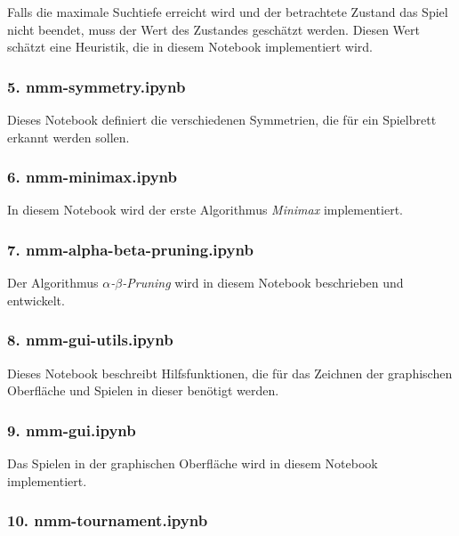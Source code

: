 \documentclass[11pt]{article}
\begin{document}
Falls die maximale Suchtiefe erreicht wird und der betrachtete Zustand
das Spiel nicht beendet, muss der Wert des Zustandes geschätzt werden.
Diesen Wert schätzt eine Heuristik, die in diesem Notebook implementiert
wird.

\hypertarget{nmm-symmetry.ipynb}{%
\subsubsection{5. nmm-symmetry.ipynb}\label{nmm-symmetry.ipynb}}

Dieses Notebook definiert die verschiedenen Symmetrien, die für ein
Spielbrett erkannt werden sollen.

\hypertarget{nmm-minimax.ipynb}{%
\subsubsection{6. nmm-minimax.ipynb}\label{nmm-minimax.ipynb}}

In diesem Notebook wird der erste Algorithmus \emph{Minimax}
implementiert.

\hypertarget{nmm-alpha-beta-pruning.ipynb}{%
\subsubsection{7.
nmm-alpha-beta-pruning.ipynb}\label{nmm-alpha-beta-pruning.ipynb}}

Der Algorithmus \emph{$\alpha$-$\beta$-Pruning} wird in diesem Notebook beschrieben
und entwickelt.

\hypertarget{nmm-gui-utils.ipynb}{%
\subsubsection{8. nmm-gui-utils.ipynb}\label{nmm-gui-utils.ipynb}}

Dieses Notebook beschreibt Hilfsfunktionen, die für das Zeichnen der
graphischen Oberfläche und Spielen in dieser benötigt werden.

\hypertarget{nmm-gui.ipynb}{%
\subsubsection{9. nmm-gui.ipynb}\label{nmm-gui.ipynb}}

Das Spielen in der graphischen Oberfläche wird in diesem Notebook
implementiert.

\hypertarget{nmm-tournament.ipynb}{%
\subsubsection{10. nmm-tournament.ipynb}\label{nmm-tournament.ipynb}}
\end{document}
